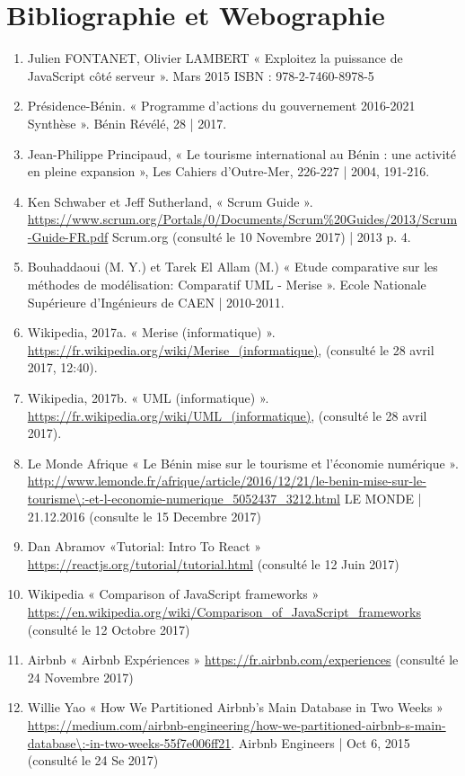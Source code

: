 \chapter{Bibliographie et Webographie}


\begin{enumerate}
	\item Julien FONTANET, Olivier LAMBERT « Exploitez la puissance de JavaScript côté serveur ». Mars 2015 ISBN : 978-2-7460-8978-5
	\item Présidence-Bénin. « Programme d'actions du gouvernement 2016-2021 Synthèse ». Bénin Révélé, 28 | 2017.
	\item Jean-Philippe Principaud, « Le tourisme international au Bénin : une activité en pleine expansion », Les Cahiers d’Outre-Mer, 226-227 | 2004, 191-216.
	\item Ken Schwaber et Jeff Sutherland, « Scrum Guide ». \url{https://www.scrum.org/Portals/0/Documents/Scrum\%20Guides/2013/Scrum-Guide-FR.pdf} Scrum.org (consulté le 10 Novembre 2017) | 2013 p. 4.
	\item Bouhaddaoui (M. Y.) et Tarek El Allam (M.) « Etude comparative sur les méthodes de modélisation: Comparatif UML - Merise ». Ecole Nationale Supérieure d'Ingénieurs de CAEN | 2010-2011.
	\item Wikipedia, 2017a. « Merise (informatique) ». \url{https://fr.wikipedia.org/wiki/Merise\_(informatique)}, (consulté le 28 avril 2017, 12:40).
	\item Wikipedia, 2017b. « UML (informatique) ». \url{https://fr.wikipedia.org/wiki/UML\_(informatique)}, (consulté le 28 avril 2017).
	\item Le Monde Afrique « Le Bénin mise sur le tourisme et l’économie numérique ». \url{http://www.lemonde.fr/afrique/article/2016/12/21/le-benin-mise-sur-le-tourisme\:-et-l-economie-numerique\_5052437\_3212.html} LE MONDE | 21.12.2016 (consulte le 15 Decembre 2017)
	\item Dan Abramov «Tutorial: Intro To React » \url{https://reactjs.org/tutorial/tutorial.html} (consulté le 12 Juin 2017)
	\item Wikipedia « Comparison of JavaScript frameworks » \url{https://en.wikipedia.org/wiki/Comparison_of_JavaScript_frameworks} (consulté le 12 Octobre 2017)
	\item Airbnb « Airbnb Expériences » \url{https://fr.airbnb.com/experiences} (consulté le 24 Novembre 2017)
	\item Willie Yao « How We Partitioned Airbnb’s Main Database in Two Weeks » \url{https://medium.com/airbnb-engineering/how-we-partitioned-airbnb-s-main-database\:-in-two-weeks-55f7e006ff21}. Airbnb Engineers | Oct 6, 2015 (consulté le 24 Se 2017)

\end{enumerate}
